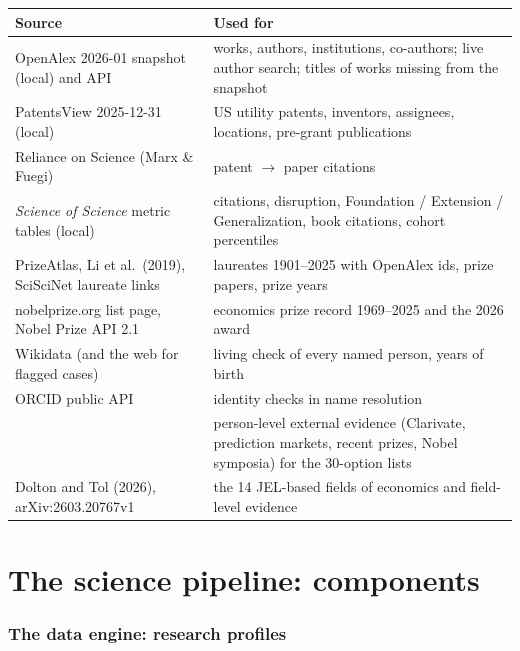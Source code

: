 \documentclass[11pt,a4paper]{article}
\begin{document}
\begin{center}
\small
\begin{tabularx}{\textwidth}{@{}lL@{}}
\toprule
Source & Used for \\
\midrule
OpenAlex 2026-01 snapshot (local) and API & works, authors, institutions, co-authors; live author search; titles of works missing from the snapshot \\
PatentsView 2025-12-31 (local) & US utility patents, inventors, assignees, locations, pre-grant publications \\
Reliance on Science (Marx \& Fuegi) & patent $\rightarrow$ paper citations \\
\emph{Science of Science} metric tables (local) & citations, disruption, Foundation / Extension / Generalization, book citations, cohort percentiles \\
PrizeAtlas, Li et al.\ (2019), SciSciNet laureate links & laureates 1901--2025 with OpenAlex ids, prize papers, prize years \\
nobelprize.org list page, Nobel Prize API 2.1 & economics prize record 1969--2025 and the 2026 award \\
Wikidata (and the web for flagged cases) & living check of every named person, years of birth \\
ORCID public API & identity checks in name resolution \\
 & person-level external evidence (Clarivate, prediction markets, recent prizes, Nobel symposia) for the 30-option lists \\
Dolton and Tol (2026), arXiv:2603.20767v1 & the 14 JEL-based fields of economics and field-level evidence \\
\bottomrule
\end{tabularx}
\end{center}
\part{The science pipeline: components}\label{part:science}

\section{The data engine: research profiles}\label{sec:profiles}
\end{document}
